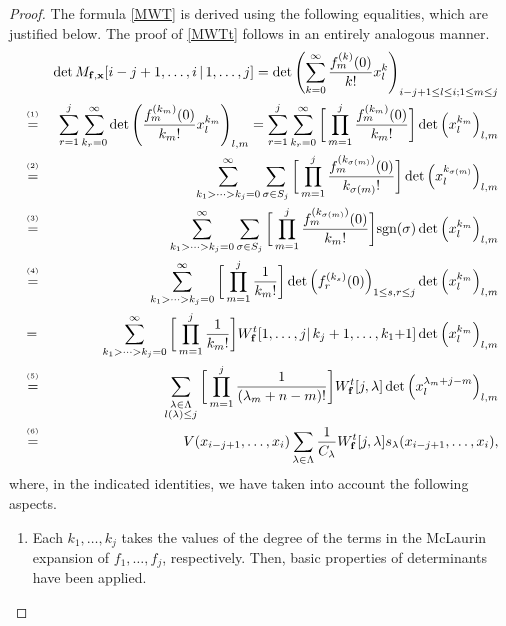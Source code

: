 \documentclass[smallextended]{svjour3}       %
\begin{document}
\begin{proof}
The formula \eqref{MWT} is derived using the following equalities, which are justified below. The proof of \eqref{MWTt} follows  in an entirely analogous manner. 
    \begin{eqnarray*}
    &&\det M_{\bf f, \bf x}{[i-j+1,\dots,i\,|\,1,\dots, j]} =\det \left( \sum_{k=0}^\infty \frac{f_m^{(k)}(0)}{k!}x_l^{k}\right)_{i-j+1 \le l \le i; 1\le m \le j} \nonumber \\%
    &\stackrel{^{(1)}}{=}&{  \sum_{r=1}^j \sum_{k_r=0}^\infty \det\left(  \frac{f_m^{(k_m)}(0)}{k_m!}x_l^{k_m}\right)_{l,m}
    =\sum_{r=1}^j \sum_{k_r=0}^\infty   \bigg[\prod_{m=1}^j \frac{f_m^{(k_m)}(0)}{k_m!}\bigg]\det\left( x_l^{k_m}\right)_{l,m} }\\
    &\stackrel{^{(2)}}{=}&   \sum_{k_1>\cdots> k_j=0}^\infty \sum_{\sigma\in S_j} \bigg[\prod_{m=1}^j \frac{f_{m}^{(k_{\sigma(m)})}(0)}{k_{\sigma(m)}!}\bigg]\det\Big(x_l^{k_{\sigma(m)}}\Big)_{l,m}  \nonumber\\
    &\stackrel{^{(3)}}{=}&\sum_{k_1>\cdots> k_j=0}^\infty \sum_{\sigma\in S_j} \bigg[\prod_{m=1}^j \frac{f_m^{(k_{\sigma(m)})}(0)}{   k_{m}!}\bigg]\text{sgn}(\sigma)\det\Big(x_l^{k_m}\Big)_{l,m}\nonumber\\
    &\stackrel{^{(4)}}{=}&\sum_{k_1>\cdots> k_j=0}^\infty  \bigg[\prod_{m=1}^j \frac{1}{k_m!}\bigg]\det\Big(f_r^{(k_s)}(0)\Big)_{1\leq s,r\leq j}\det\Big(x_l^{k_m}\Big)_{l,m}\nonumber \\
    &=&\sum_{k_1>\cdots> k_j=0}^\infty  \bigg[\prod_{m=1}^j \frac{1}{k_m!}\bigg]W_{\bf f}^t{[1,\dots,j|\,k_j+1,\dots,k_1{  +1}]}\det\Big(x_l^{k_m}\Big)_{l,m}\nonumber \\
    &\stackrel{^{(5)}}{=}&\sum_{\substack{ \lambda\in\Lambda\\
    l(\lambda)\leq j}}  \bigg[\prod_{m=1}^j \frac{1}{(\lambda_m+n-m)!}\bigg]W^t_{{\bf f}}{[j,\lambda]}\det\Big(x_l^{\lambda_m+j-m}\Big)_{l,m}\nonumber \\
    &\stackrel{^{(6)}}{=}& V( x_{i-j+1},\dots,x_i) \sum_{\lambda\in \Lambda}\frac{1}{C_\lambda}W^t_{{\bf f}}{[j,\lambda]}s_{\lambda}(x_{i-j+1},\dots,x_i),
\end{eqnarray*}
where, in the indicated identities, we have taken into account the following aspects.
\begin{enumerate}
    \item[(1)] 
Each $k_1,\dots,k_j$ takes the values of the degree of the terms in the McLaurin expansion of $f_1,\ldots, f_j$, respectively.  Then,  basic properties of determinants have been applied. 
    

\end{enumerate}
\end{proof}
\end{document}
